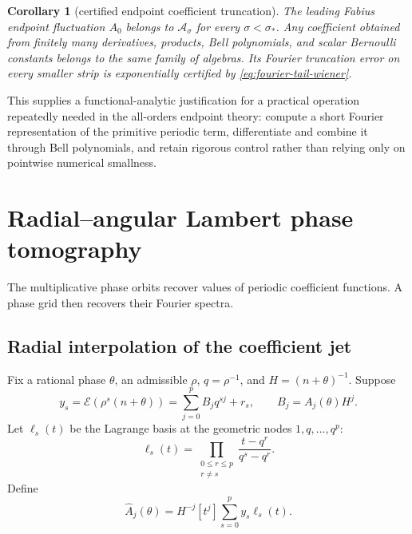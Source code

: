 \documentclass[11pt,oneside]{article}
\numberwithin{equation}{section}
\newtheorem{corollary}[theorem]{Corollary}
\theoremstyle{definition}
\theoremstyle{remark}
\newcommand{\Wiener}{\mathcal A}
\begin{document}
\begin{corollary}[certified endpoint coefficient truncation]
\label{cor:certified-bell}
The leading Fabius endpoint fluctuation $A_0$ belongs to $\Wiener_\sigma$ for every
$\sigma<\sigma_*$.  Any coefficient obtained from finitely many derivatives, products,
Bell polynomials, and scalar Bernoulli constants belongs to the same family of algebras.
Its Fourier truncation error on every smaller strip is exponentially certified by
\eqref{eq:fourier-tail-wiener}.
\end{corollary}

This supplies a functional-analytic justification for a practical operation repeatedly
needed in the all-orders endpoint theory: compute a short Fourier representation of the
primitive periodic term, differentiate and combine it through Bell polynomials, and retain
rigorous control rather than relying only on pointwise numerical smallness.

\section{Radial--angular Lambert phase tomography}
\label{sec:tomography}

The multiplicative phase orbits recover values of periodic coefficient functions.  A phase
grid then recovers their Fourier spectra.

\subsection{Radial interpolation of the coefficient jet}

Fix a rational phase $\theta$, an admissible $\rho$, $q=\rho^{-1}$, and
$H=(n+\theta)^{-1}$.  Suppose
\begin{equation}
 y_s=\mathscr E(\rho^s(n+\theta))
 =\sum_{j=0}^{p}B_jq^{sj}+r_s,
 \qquad B_j=A_j(\theta)H^j.
 \label{eq:radial-polynomial-model}
\end{equation}
Let $\ell_s(t)$ be the Lagrange basis at the geometric nodes
$1,q,\ldots,q^p$:
\begin{equation}
 \ell_s(t)=\prod_{\substack{0\le r\le p\\r\ne s}}
 \frac{t-q^r}{q^s-q^r}.
 \label{eq:geometric-lagrange-basis}
\end{equation}
Define
\begin{equation}
 \widehat A_j(\theta)
 =H^{-j}[t^j]\sum_{s=0}^{p}y_s\ell_s(t).
 \label{eq:radial-jet-estimator}
\end{equation}
\end{document}
